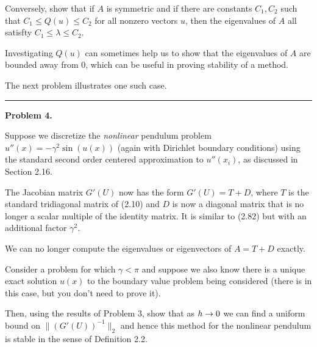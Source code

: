 \documentclass[10pt]{article}
\begin{document}
Conversely, show that if $A$ is symmetric and if
there are constants $C_1,C_2$ such that
$C_1 \leq Q(u) \leq C_2$ for all nonzero vectors $u$, then the eigenvalues 
of $A$ all satisfty $C_1 \leq \lambda \leq C_2$.

Investigating $Q(u)$ can sometimes help us to show that the eigenvalues of
$A$ are bounded away from 0, which can be useful in proving stability
of a method.

The next problem illustrates one such case.





\vskip 1cm
\hrule
{\bf Problem 4.}



Suppose we discretize the {\em nonlinear} pendulum problem $u''(x) =
-\gamma^2 \sin(u(x))$ (again with Dirichlet boundary conditions) using
the standard second order centered approximation to $u''(x_i)$, as 
discussed in Section 2.16. 

The Jacobian matrix $G'(U)$ now has the form $G'(U)=T+D$,
where $T$ is the standard tridiagonal matrix of (2.10) and $D$ is now a
diagonal matrix that is no longer a scalar multiple of the identity matrix.
It is similar to (2.82) but with an additional factor $\gamma^2$.

We can no longer compute the eigenvalues or eigenvectors of $A=T+D$ exactly.

Consider a problem for which $\gamma < \pi$ and suppose we also
know there is a unique exact solution $u(x)$ to the boundary value
problem being considered (there is in this case, but you don't need
to prove it).

Then, using the results of Problem 3, show that as $h \rightarrow 0$ we
can find a uniform bound on $\|(G'(U))^{-1}\|_2$ and hence this
method for the nonlinear pendulum is stable in the sense of Definition 2.2.






\end{document}

